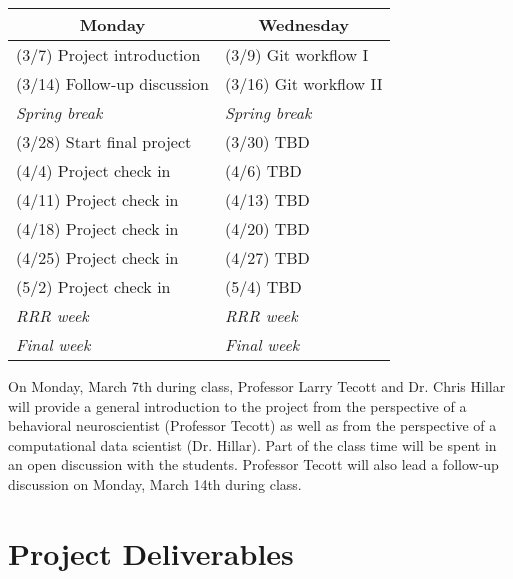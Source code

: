 \documentclass[11pt, oneside]{article}   	%
\begin{document}
\begin{table}[h]
\centering
\begin{tabular}{@{}l|l@{}}
\toprule
\multicolumn{1}{c|}{Monday} & \multicolumn{1}{c}{Wednesday} \\
\hline
(3/7) Project introduction     & (3/9) Git workflow I \\
(3/14) Follow-up discussion    & (3/16) Git workflow II \\
\emph{\hspace{12mm} Spring break}  & \emph{\hspace{12mm} Spring break}\\
(3/28) Start final project     & (3/30) TBD\\
(4/4) Project check in         & (4/6) TBD\\
(4/11) Project check in        & (4/13) TBD\\
(4/18) Project check in        & (4/20) TBD\\
(4/25) Project check in        & (4/27) TBD\\
(5/2) Project check in         & (5/4) TBD\\
\emph{\hspace{12mm} RRR week}  & \emph{\hspace{12mm} RRR week}\\
\emph{\hspace{12mm} Final week}  & \emph{\hspace{12mm} Final week}\\
\bottomrule
\end{tabular}
\end{table}

On Monday, March 7th during class, Professor Larry Tecott and Dr. Chris Hillar
will provide a general introduction to the project from the perspective of a
behavioral neuroscientist (Professor Tecott) as well as from the perspective of
a computational data scientist (Dr. Hillar).  Part of the class time will be
spent in an open discussion with the students.  Professor Tecott will also lead
a follow-up discussion on Monday, March 14th during class.

\section{Project Deliverables}
\end{document}
